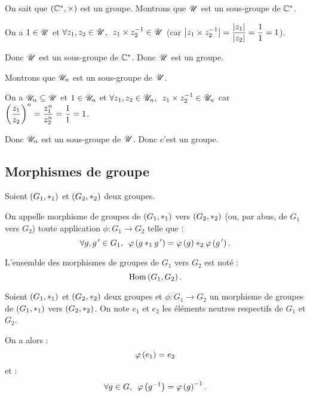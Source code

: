 \begin{dem}
On sait que \(\groupe{\Cs}[\times]\) est un groupe. Montrons que \(\mathscr{U}\) est un sous-groupe de \(\mathbb{C}^*\).

On a \(1\in\mathscr{U}\) et \(\quantifs{\forall z_1,z_2\in\U}z_1\times z_2\inv\in\U\) (car \(\left\lvert z_1\times z_2^{-1}\right\rvert=\dfrac{\left\lvert z_1\right\rvert}{\left\lvert z_2\right\rvert}=\dfrac{1}{1}=1\)).

Donc \(\mathscr{U}\) est un sous-groupe de \(\mathbb{C}^*\). Donc \(\mathscr{U}\) est un groupe.

Montrons que \(\mathscr{U}_n\) est un sous-groupe de \(\mathscr{U}\).

On a \(\mathscr{U}_n\subseteq\mathscr{U}\) et \(1\in\mathscr{U}_n\) et \(\quantifs{\forall z_1,z_2\in\U_n}z_1\times z_2\inv\in\U_n\) car \(\left(\dfrac{z_1}{z_2}\right)^n=\dfrac{z_1^n}{z_2^n}=\dfrac{1}{1}=1\).

Donc \(\mathscr{U}_n\) est un sous-groupe de \(\mathscr{U}\). Donc c'est un groupe.
\end{dem}

\subsection{Morphismes de groupe}

\begin{defi}
Soient \(\groupe{G_1}[*_1]\) et \(\groupe{G_2}[*_2]\) deux groupes.

On appelle morphisme de groupes de \(\groupe{G_1}[*_1]\) vers \(\groupe{G_2}[*_2]\) (ou, par abus, de \(G_1\) vers \(G_2\)) toute application \(\phi:G_1\to G_2\) telle que : \[\quantifs{\forall g,g\prim\in G_1}\phi\paren{g*_1g\prim}=\phi\paren{g}*_2\phi\paren{g\prim}.\]

L'ensemble des morphismes de groupes de \(G_1\) vers \(G_2\) est noté : \[\operatorname{Hom}\left(G_1,G_2\right).\]
\end{defi}

\begin{prop}
Soient \(\groupe{G_1}[*_1]\) et \(\groupe{G_2}[*_2]\) deux groupes et \(\phi:G_1\to G_2\) un morphisme de groupes de \(\groupe{G_1}[*_1]\) vers \(\groupe{G_2}[*_2]\). On note \(e_1\) et \(e_2\) les éléments neutres respectifs de \(G_1\) et \(G_2\).

On a alors : \[\varphi\left(e_1\right)=e_2\] et : \[\quantifs{\forall g\in G}\phi\paren{g\inv}=\phi\paren{g}\inv.\]
\end{prop}

